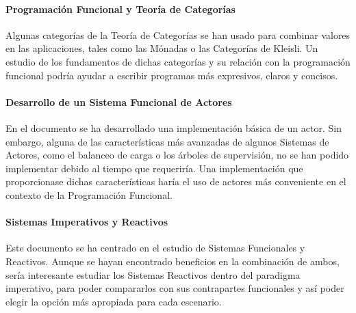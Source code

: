 \documentclass[../main.tex]{subfiles}
\begin{document}
\paragraph{Programación Funcional y Teoría de Categorías}

Algunas categorías de la Teoría de Categorías se han usado para combinar valores
en las aplicaciones, tales como las Mónadas o las Categorías de Kleisli. Un estudio
de los fundamentos de dichas categorías y su relación con la programación funcional
podría ayudar a escribir programas más expresivos, claros y concisos.

\paragraph{Desarrollo de un Sistema Funcional de Actores}

En el documento se ha desarrollado una implementación básica de un actor. Sin embargo,
alguna de las características más avanzadas de algunos Sistemas de Actores, como el balanceo
de carga o los árboles de supervisión, no se han podido implementar debido al tiempo que
requeriría. Una implementación que proporcionase dichas características haría el uso de actores
más conveniente en el contexto de la Programación Funcional.

\paragraph{Sistemas Imperativos y Reactivos}
Este documento se ha centrado en el estudio de Sistemas Funcionales y Reactivos.
Aunque se hayan encontrado beneficios en la combinación de ambos, sería interesante
estudiar los Sistemas Reactivos dentro del paradigma imperativo, para poder compararlos con
sus contrapartes funcionales y así poder elegir la opción más apropiada para cada escenario.
\end{document}
